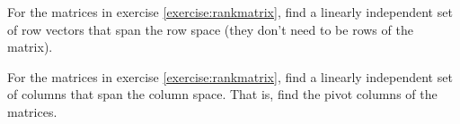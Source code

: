 \documentclass{ximera}
\begin{document}
\begin{exercise}
    For the matrices in exercise \ref{exercise:rankmatrix}, find a linearly independent set of row vectors that span the row space (they don't need to be rows of the matrix).
\end{exercise}

\begin{exercise}
    For the matrices in exercise \ref{exercise:rankmatrix}, find a linearly independent set of columns that span the column space. That is, find the pivot columns of the matrices.
\end{exercise}
\end{document}
